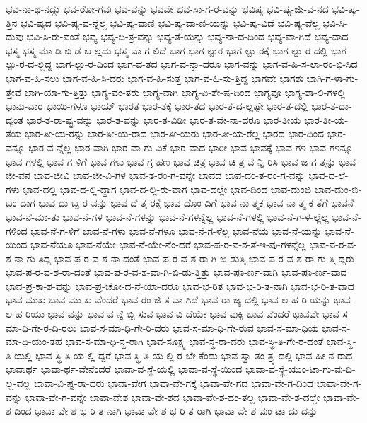 {ಭವ-ನಾ-ಥ-ನದ್ದು
ಭವ-ರೋ-ಗವು
ಭವ-ವನ್ನು
ಭವವೇ
ಭವ-ಸಾ-ಗ-ರ-ವನ್ನು
ಭವಿಷ್ಯ
ಭವಿ-ಷ್ಯ-ಜೀ-ವ-ನದ
ಭವಿ-ಷ್ಯ-ತ್ತಿನ
ಭವಿ-ಷ್ಯದ
ಭವಿ-ಷ್ಯ-ವ-ನ್ನೆಲ್ಲ
ಭವಿ-ಷ್ಯ-ವಾಣಿ
ಭವಿ-ಷ್ಯ-ವಾ-ಣಿ-ಯನ್ನು
ಭವಿ-ಷ್ಯ-ವಿದೆ
ಭವಿ-ಷ್ಯ-ವೆಲ್ಲ
ಭವಿ-ಸಿ-ದುವು
ಭವಿ-ಸಿ-ರು-ವಂತೆ
ಭವ್ಯ
ಭವ್ಯ-ಚಿ-ತ್ರ-ವನ್ನು
ಭವ್ಯ-ತೆ-ಯನ್ನು
ಭವ್ಯ-ನಾ-ದ-ದಿಂದ
ಭವ್ಯ-ವಾ-ಗಿದೆ
ಭವ್ಯ-ವಾದ
ಭಸ್ಮ
ಭಸ್ಮ-ಮಾ-ಡಿ-ಬಿ-ಡ-ಬ-ಲ್ಲದು
ಭಸ್ಮ-ವಾ-ಗ-ಲಿದೆ
ಭಾಗ
ಭಾಗ-ಲ್ಪುರ
ಭಾಗ-ಲ್ಪು-ರಕ್ಕೆ
ಭಾಗ-ಲ್ಪು-ರ-ದಲ್ಲಿ
ಭಾಗ-ಲ್ಪು-ರ-ದ-ಲ್ಲಿದ್ದ
ಭಾಗ-ಲ್ಪು-ರ-ದಿಂದ
ಭಾಗ-ವ-ತದ
ಭಾಗ-ವ-ನ್ನಾ-ದರೂ
ಭಾಗ-ವನ್ನು
ಭಾಗ-ವ-ಹಿ-ಸ-ಲಾ-ರಂ-ಭಿ-ಸಿದ
ಭಾಗ-ವ-ಹಿ-ಸಲು
ಭಾಗ-ವ-ಹಿ-ಸಿ-ದರು
ಭಾಗ-ವ-ಹಿ-ಸುತ್ತ
ಭಾಗ-ವ-ಹಿ-ಸು-ತ್ತಿದ್ದ
ಭಾಗವೇ
ಭಾಗಶಃ
ಭಾಗಿ-ಗ-ಳಾ-ಗು-ತ್ತೇವೆ
ಭಾಗಿ-ಯಾ-ಗು-ತ್ತಿತ್ತು
ಭಾಗ್ಯ-ವಂ-ತರು
ಭಾಗ್ಯ-ವಾಗಿ
ಭಾಗ್ಯ-ವಿ-ಶೇ-ಷ-ದಿಂದ
ಭಾಗ್ಯವೂ
ಭಾಗ್ಯ-ಶಾ-ಲಿ-ಗಳಲ್ಲಿ
ಭಾನು-ವಾರ
ಭಾಯಿ-ಗಳೂ
ಭಾಯ್
ಭಾರತ
ಭಾರ-ತಕ್ಕೆ
ಭಾರ-ತದ
ಭಾರ-ತ-ದ-ಲ್ಲಷ್ಟೇ
ಭಾರ-ತ-ದಲ್ಲಿ
ಭಾರ-ತ-ದಾ-ದ್ಯಂತ
ಭಾರ-ತ-ರಾ-ಷ್ಟ್ರ-ವನ್ನು
ಭಾರ-ತ-ವನ್ನು
ಭಾರ-ತ-ವಿಡೀ
ಭಾರ-ತ-ವೇ-ನಾ-ದರೂ
ಭಾರ-ತೀಯ
ಭಾರ-ತೀ-ಯ-ತೆಯ
ಭಾರ-ತೀ-ಯ-ರನ್ನು
ಭಾರ-ತೀ-ಯ-ರಾದ
ಭಾರ-ತೀ-ಯರು
ಭಾರ-ತೀ-ಯ-ರೆಲ್ಲ
ಭಾರದ
ಭಾರ-ದಿಂದ
ಭಾರ-ವನ್ನೂ
ಭಾರ-ವ-ನ್ನೆಲ್ಲ
ಭಾರ-ವಾಗಿ
ಭಾರ-ವಾ-ಗು-ವಿಕೆ
ಭಾರ-ವಾದ
ಭಾರೀ
ಭಾವ
ಭಾವಕ್ಕೆ
ಭಾವ-ಗಳ
ಭಾವ-ಗಳನ್ನೂ
ಭಾವ-ಗಳಲ್ಲಿ
ಭಾವ-ಗ-ಳಿಗೆ
ಭಾವ-ಗಳು
ಭಾವ-ಗ್ರ-ಹಣ
ಭಾವ-ಚಿತ್ರ
ಭಾವ-ಚಿ-ತ್ರ-ವ-ನ್ನಿ-ರಿಸಿ
ಭಾವ-ಜ-ಗ-ತ್ತನ್ನು
ಭಾವ-ಜೀ-ವನ
ಭಾವ-ಜೀವಿ
ಭಾವ-ಜೀ-ವಿ-ಗಳ
ಭಾವ-ತ-ರಂ-ಗ-ವನ್ನೇ
ಭಾವದ
ಭಾವ-ದಂ-ತ-ರಂ-ಗ-ವನ್ನು
ಭಾವ-ದ-ಲೆ-ಗಳು
ಭಾವ-ದಲ್ಲಿ
ಭಾವ-ದ-ಲ್ಲಿ-ದ್ದಾಗ
ಭಾವ-ದ-ಲ್ಲಿ-ರು-ವಾಗ
ಭಾವ-ದಲ್ಲೇ
ಭಾವ-ದಿಂದ
ಭಾವ-ದುಂಬಿ
ಭಾವ-ದುಂ-ಬಿ-ಬಂ-ದಾಗ
ಭಾವ-ದು-ಬ್ಬ-ರ-ವನ್ನು
ಭಾವ-ದೆ-ತ್ತ-ರಕ್ಕೆ
ಭಾವ-ದೊಂ-ದಿಗೆ
ಭಾವ-ನಾ-ತ್ಮಕ
ಭಾವ-ನಾ-ತ್ಮ-ಕ-ತೆಗೆ
ಭಾವನೆ
ಭಾವ-ನೆ-ಮಾ-ತು
ಭಾವ-ನೆ-ಗಳ
ಭಾವ-ನೆ-ಗಳನ್ನು
ಭಾವ-ನೆ-ಗಳನ್ನೆಲ್ಲ
ಭಾವ-ನೆ-ಗಳಲ್ಲಿ
ಭಾವ-ನೆ-ಗ-ಳ-ಲ್ಲೆಲ್ಲ
ಭಾವ-ನೆ-ಗಳಿಂದ
ಭಾವ-ನೆ-ಗ-ಳಿಗೆ
ಭಾವ-ನೆ-ಗಳು
ಭಾವ-ನೆ-ಗಳೂ
ಭಾವ-ನೆ-ಗ-ಳೆಲ್ಲ
ಭಾವ-ನೆಯ
ಭಾವ-ನೆ-ಯನ್ನು
ಭಾವ-ನೆ-ಯಿಂದ
ಭಾವ-ನೆಯೂ
ಭಾವ-ನೆಯೇ
ಭಾವ-ನೆ-ಯೇ-ನೆಂ-ದರೆ
ಭಾವ-ಪ-ರ-ವ-ಶ-ತೆ-ಇ-ವು-ಗಳನ್ನೆಲ್ಲ
ಭಾವ-ಪ-ರ-ವ-ಶ-ನಾ-ಗು-ತಿದ್ದ
ಭಾವ-ಪ-ರ-ವ-ಶ-ನಾ-ದಂತೆ
ಭಾವ-ಪ-ರ-ವ-ಶ-ರಾ-ಗಿ-ಬಿ-ಡುತ್ತಿ
ಭಾವ-ಪ-ರ-ವ-ಶ-ರಾ-ಗು-ತ್ತಿ-ದ್ದರು
ಭಾವ-ಪ-ರ-ವ-ಶ-ರಾ-ದಂತೆ
ಭಾವ-ಪ-ರ-ವ-ಶ-ವಾ-ಗಿ-ಬಿ-ಡು-ತ್ತಿತ್ತು
ಭಾವ-ಪೂ-ರ್ಣ-ವಾಗಿ
ಭಾವ-ಪೂ-ರ್ಣ-ವಾದ
ಭಾವ-ಪ್ರ-ಕಾ-ಶ-ವನ್ನು
ಭಾವ-ಪ್ರ-ಚೋ-ದ-ನೆ-ಯಾ-ದರೂ
ಭಾವ-ಭ-ರಿತ
ಭಾವ-ಭ-ರಿ-ತ-ನಾಗಿ
ಭಾವ-ಭ-ರಿ-ತ-ವಾದ
ಭಾವ-ಮುಖ
ಭಾವ-ಮು-ಖ-ವೆಂದರೆ
ಭಾವ-ರಂ-ಜಿ-ತ-ವಾ-ಗಿದೆ
ಭಾವ-ರಾ-ಜ್ಯ-ದಲ್ಲಿ
ಭಾವ-ಲ-ಹ-ರಿ-ಯನ್ನು
ಭಾವ-ಲ-ಹ-ರಿಯು
ಭಾವ-ವನ್ನು
ಭಾವ-ವ-ನ್ನೆ-ಬ್ಬಿ-ಸುವ
ಭಾವ-ವಿ-ದೆಯೇ
ಭಾವ-ವುಕ್ಕಿ
ಭಾವ-ವೆಂದರೆ
ಭಾವವೇ
ಭಾವ-ಸ-ಮಾ-ಧಿ-ಗೇ-ರ-ದಿ-ರಲು
ಭಾವ-ಸ-ಮಾ-ಧಿ-ಗೇ-ರಿ-ದರು
ಭಾವ-ಸ-ಮಾ-ಧಿ-ಗೇ-ರುವ
ಭಾವ-ಸ-ಮಾ-ಧಿಯ
ಭಾವ-ಸ-ಮಾ-ಧಿ-ಯಂ-ತಹ
ಭಾವ-ಸ-ಮಾ-ಧಿ-ಸ್ಥ-ರಾಗಿ
ಭಾವ-ಸೂಕ್ಷ್ಮ
ಭಾವ-ಸ್ಥ-ರಾ-ದರು
ಭಾವ-ಸ್ಥಿ-ತಿ-ಗೇ-ರ-ದಂತೆ
ಭಾವ-ಸ್ಥಿ-ತಿ-ಯಲ್ಲಿ
ಭಾವ-ಸ್ಥಿ-ತಿ-ಯ-ಲ್ಲಿ-ದ್ದರೆ
ಭಾವ-ಸ್ಥಿ-ತಿ-ಯ-ಲ್ಲಿ-ರ-ಬೇ-ಕೆಂದು
ಭಾವ-ಸ್ವಾ-ತಂ-ತ್ರ್ಯ-ದಲ್ಲಿ
ಭಾವ-ಹೀ-ನ-ರಾದ
ಭಾವಾರ್ಥ
ಭಾವಾ-ರ್ಥ-ವೇನೆಂದರೆ
ಭಾವಾ-ವ-ಸ್ಥೆ-ಯಲ್ಲಿ
ಭಾವಾ-ವ-ಸ್ಥೆ-ಯಿಂದ
ಭಾವಾ-ವ-ಸ್ಥೆ-ಯುಂ-ಟಾ-ಗು-ವು-ದಿ-ಲ್ಲ-ವಲ್ಲ
ಭಾವಾ-ವಿ-ಷ್ಟ-ರಾ-ದರು
ಭಾವಾ-ವೇಗ
ಭಾವಾ-ವೇ-ಗಕ್ಕೆ
ಭಾವಾ-ವೇ-ಗದ
ಭಾವಾ-ವೇ-ಗ-ದಿಂದ
ಭಾವಾ-ವೇ-ಗ-ವನ್ನು
ಭಾವಾ-ವೇ-ಗ-ವನ್ನೇ
ಭಾವಾ-ವೇಶ
ಭಾವಾ-ವೇ-ಶದ
ಭಾವಾ-ವೇ-ಶ-ದಂ-ತಲ್ಲ
ಭಾವಾ-ವೇ-ಶ-ದಲ್ಲೇ
ಭಾವಾ-ವೇ-ಶ-ದಿಂದ
ಭಾವಾ-ವೇ-ಶ-ಭ-ರಿ-ತ-ನಾಗಿ
ಭಾವಾ-ವೇ-ಶ-ಭ-ರಿ-ತ-ರಾಗಿ
ಭಾವಾ-ವೇ-ಶ-ವುಂ-ಟಾ-ದು-ದನ್ನು
}
